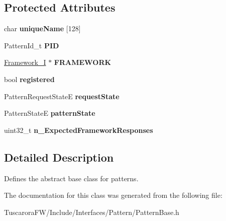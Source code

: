 \subsection*{Protected Attributes}
\begin{DoxyCompactItemize}
\item 
char {\bfseries unique\+Name} \mbox{[}128\mbox{]}\hypertarget{class_patterns_1_1_pattern_base_a6cff7cf408b665d720a0d2b82a0db9e8}{}\label{class_patterns_1_1_pattern_base_a6cff7cf408b665d720a0d2b82a0db9e8}

\item 
Pattern\+Id\+\_\+t {\bfseries P\+ID}\hypertarget{class_patterns_1_1_pattern_base_aa623ac5f4137e880067aff2092a8c732}{}\label{class_patterns_1_1_pattern_base_aa623ac5f4137e880067aff2092a8c732}

\item 
\hyperlink{class_p_w_i_1_1_framework___i}{Framework\+\_\+I} $\ast$ {\bfseries F\+R\+A\+M\+E\+W\+O\+RK}\hypertarget{class_patterns_1_1_pattern_base_a88b5eb77647f9e40ea741eaf6390d8bf}{}\label{class_patterns_1_1_pattern_base_a88b5eb77647f9e40ea741eaf6390d8bf}

\item 
bool {\bfseries registered}\hypertarget{class_patterns_1_1_pattern_base_a4305a51ad736ccc47242857352d4fa19}{}\label{class_patterns_1_1_pattern_base_a4305a51ad736ccc47242857352d4fa19}

\item 
Pattern\+Request\+StateE {\bfseries request\+State}\hypertarget{class_patterns_1_1_pattern_base_a93a8305be5ae2773af6e24fc18b5a689}{}\label{class_patterns_1_1_pattern_base_a93a8305be5ae2773af6e24fc18b5a689}

\item 
Pattern\+StateE {\bfseries pattern\+State}\hypertarget{class_patterns_1_1_pattern_base_aea5b5ffd6a1c809aa63fefe37ab79c1c}{}\label{class_patterns_1_1_pattern_base_aea5b5ffd6a1c809aa63fefe37ab79c1c}

\item 
uint32\+\_\+t {\bfseries n\+\_\+\+Expected\+Framework\+Responses}\hypertarget{class_patterns_1_1_pattern_base_a5898c2c8a20f9b949abe14cc85cea048}{}\label{class_patterns_1_1_pattern_base_a5898c2c8a20f9b949abe14cc85cea048}

\end{DoxyCompactItemize}


\subsection{Detailed Description}
Defines the abstract base class for patterns. 

The documentation for this class was generated from the following file\+:\begin{DoxyCompactItemize}
\item 
Tuscarora\+F\+W/\+Include/\+Interfaces/\+Pattern/Pattern\+Base.\+h\end{DoxyCompactItemize}
